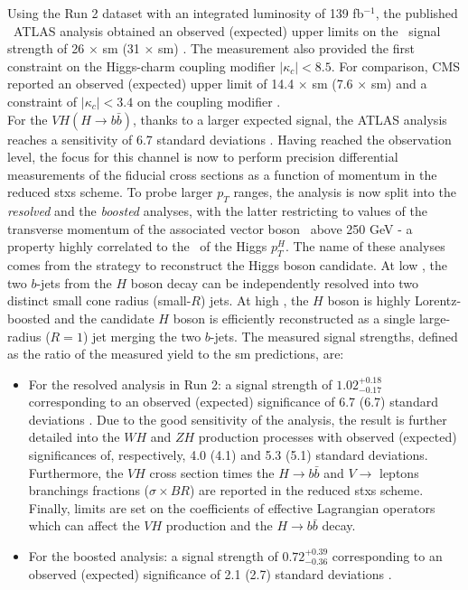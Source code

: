 Using the Run 2 dataset with an integrated luminosity of 139 fb$^{-1}$, the published \vhc\ ATLAS analysis obtained an observed (expected) upper limits on the \vhc\ signal strength of 26 $\times$ \gls{sm} (31 $\times$ \gls{sm}) \cite{Collaboration:2721696}. The measurement also provided the first constraint on the Higgs-charm coupling modifier $|\kappa_c| < 8.5$. For comparison, CMS reported an observed (expected) upper limit of 14.4 $\times$ \gls{sm} (7.6 $\times$ \gls{sm}) and a constraint of $|\kappa_c| < 3.4 $ on the coupling modifier \cite{arXiv:2205.05550}. \\ 

For the $VH (H\rightarrow b\bar{b})$, thanks to a larger expected signal, the ATLAS analysis reaches a sensitivity of 6.7 standard deviations \cite{ATLAS:2020fcp}. Having reached the observation level, the focus for this channel is now to perform precision differential measurements of the fiducial cross sections as a function of momentum in the reduced \gls{stxs} scheme. To probe larger $p_T$ ranges, the analysis is now split into the \textit{resolved} \cite{ATLAS:2020fcp} and the \textit{boosted} \cite{ATLAS:2020jwz} analyses, with the latter restricting to values of the transverse momentum of the associated vector boson \ptv\ above 250 GeV - a property highly correlated to the \pt\ of the Higgs $p_T^H$. The name of these analyses comes from the strategy to reconstruct the Higgs boson candidate. At low \ptv, the two $b$-jets from the $H$ boson decay can be independently resolved into two distinct small cone radius (small-$R$) jets. At high \ptv, the $H$ boson is highly Lorentz-boosted and the candidate $H$ boson is efficiently reconstructed as a single large-radius ($R = 1$) jet merging the two $b$-jets. The measured signal strengths, defined as the ratio of the measured yield to the \gls{sm} predictions, are: 
\begin{itemize}
\item For the resolved analysis in Run 2: a signal strength of $1.02_{-0.17}^{+0.18}$ corresponding to an observed (expected) significance of 6.7 (6.7) standard deviations \cite{ATLAS:2020fcp}. Due to the good sensitivity of the analysis, the result is further detailed into the $WH$ and $ZH$ production processes with observed (expected) significances of, respectively, 4.0 (4.1) and 5.3 (5.1) standard deviations. Furthermore, the $VH$ cross section times the $H \rightarrow b\bar{b}$ and $V\rightarrow$ leptons branchings fractions ($\sigma \times BR$) are reported in the reduced \gls{stxs} scheme. Finally, limits are set on the coefficients of effective Lagrangian operators which can affect the $VH$ production and the $H \rightarrow b\bar{b}$ decay.
\item For the boosted analysis: a signal strength of  $0.72_{-0.36}^{+0.39}$ corresponding to an observed (expected) significance of 2.1 (2.7) standard deviations \cite{ATLAS:2020jwz}.
\end{itemize}

